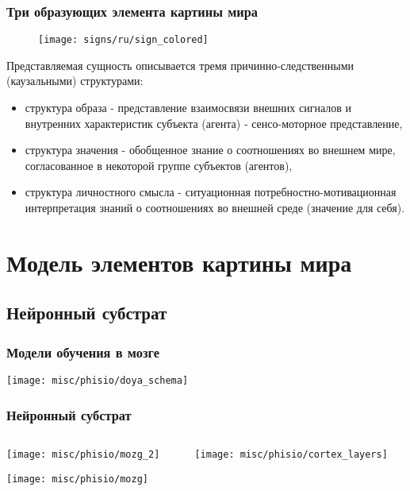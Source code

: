 \documentclass[default]{beamer}
\begin{document}
	\begin{frame}
		\frametitle{Три образующих элемента картины мира}
		\footnotesize
		\begin{figure}
			\texttt{[image: signs/ru/sign\_colored]}
		\end{figure}
		
		Представляемая сущность описывается тремя причинно-следственными (каузальными) структурами:
		\begin{itemize}
			\item {\color{red}структура образа} - представление взаимосвязи внешних сигналов и внутренних характеристик субъекта (агента) - сенсо-моторное представление,
			\item {\color{blue}структура значения} - обобщенное знание о соотношениях во внешнем мире, согласованное в некоторой группе субъектов (агентов),
			\item {\color{green!60!black}структура личностного смысла} - ситуационная потребностно-мотивационная интерпретация знаний о соотношениях во внешней среде (значение для себя).
		\end{itemize}
	\end{frame}

	\section{Модель элементов картины мира}
	\subsection{Нейронный субстрат}

	\begin{frame}
		\frametitle{Модели обучения в мозге}
		
		\begin{center}
			\texttt{[image: misc/phisio/doya\_schema]}
		\end{center}
		\vfill
		\nocite{*}
		\printbibliography[keyword={doya}, resetnumbers=true]
	\end{frame}	

	\begin{frame}
		\frametitle{Нейронный субстрат}
		
		\begin{columns}
			\begin{column}{0.35\textwidth}
				\texttt{[image: misc/phisio/mozg\_2]}
				\par\bigskip
				\hspace{-7mm}\texttt{[image: misc/phisio/mozg]}
			\end{column}
			\begin{column}{0.65\textwidth}
				\texttt{[image: misc/phisio/cortex\_layers]}
			\end{column}
		\end{columns}
		\nocite{*}
		\printbibliography[keyword={column}, resetnumbers=true]
	\end{frame}
\end{document}
